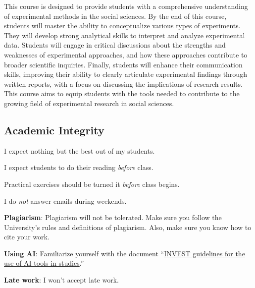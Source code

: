 \documentclass[letterpaper]{article}
\renewenvironment{itemize}{
  \begin{list}{}{
    \setlength{\leftmargin}{1.5em}
  }
}{
  \end{list}
}
\begin{document}
This course is designed to provide students with a comprehensive understanding of experimental methods in the social sciences. By the end of this course, students will master the ability to conceptualize various types of experiments. They will develop strong analytical skills to interpret and analyze experimental data. Students will engage in critical discussions about the strengths and weaknesses of experimental approaches, and how these approaches contribute to broader scientific inquiries. Finally, students will enhance their communication skills, improving their ability to clearly articulate experimental findings through written reports, with a focus on discussing the implications of research results. This course aims to equip students with the tools needed to contribute to the growing field of experimental research in social sciences.



\subsection*{Academic Integrity}

I expect nothing but the best out of my students. 

\begin{itemize}
     \item[$\circ$] I expect students to do their reading \emph{before} class.
     \item[$\circ$] Practical exercises should be turned it \emph{before} class begins. 

  \item[$\circ$] I do \emph{not} answer emails during weekends. 
\end{itemize}


\begin{itemize}
  \item[{\color{red}\Pointinghand}] {\bf Plagiarism}: Plagiarism will not be tolerated. Make sure you follow the University's rules and definitions of plagiarism. Also, make sure you know how to cite your work. 

  \item[{\color{red}\Pointinghand}] {\bf Using AI}: Familiarize yourself with the document ``\href{https://github.com/hbahamonde/Teaching_Material_Tests/raw/main/Common_resources/AI_Guidelines_2024.pdf}{INVEST guidelines for the use of AI tools in studies}.'' 

  \item[{\color{red}\Pointinghand}] {\bf Late work}: I won't accept late work.

\end{itemize}
\end{document}
